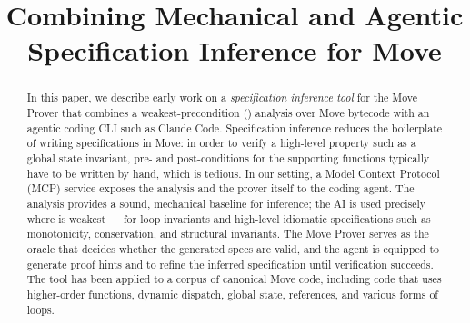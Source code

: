 \documentclass[letterpaper,conference]{fmcad}
\begin{document}
\title{Combining Mechanical and Agentic \\ Specification Inference for Move}

\author{%
}

\maketitle


\begin{abstract}
	In this paper, we describe early work on a \emph{specification inference tool} for the Move Prover that combines a weakest-precondition (\WP) analysis over Move bytecode with an agentic coding CLI such as Claude Code.
	Specification inference reduces the boilerplate of writing specifications in Move: in order to verify a high-level property such as a global state invariant, pre- and post-conditions for the supporting functions typically have to be written by hand, which is tedious.
	In our setting, a Model Context Protocol (MCP) service exposes the \WP analysis and the prover itself to the coding agent.
	The \WP analysis provides a sound, mechanical baseline for inference; the AI is used precisely where \WP is weakest --- for loop invariants and high-level idiomatic specifications such as monotonicity, conservation, and structural invariants.
	The Move Prover serves as the oracle that decides whether the generated specs are valid, and the agent is equipped to generate proof hints and to refine the inferred specification until verification succeeds.
	The tool has been applied to a corpus of canonical Move code, including code that uses higher-order functions, dynamic dispatch, global state, references, and various forms of loops.
\end{abstract}









\end{document}
